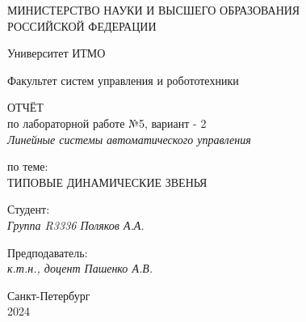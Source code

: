 \thispagestyle{empty}

\begin{center}
    МИНИСТЕРСТВО НАУКИ И ВЫСШЕГО ОБРАЗОВАНИЯ \\ РОССИЙСКОЙ ФЕДЕРАЦИИ

    \vspace{20pt}

    Университет ИТМО

    \vspace{20pt}

    Факультет систем управления и робототехники
\end{center}

\vfill

\begin{center}
    ОТЧЁТ \\  
    по лабораторной работе  №5, вариант - 2 \\
    \textit{Линейные системы автоматического управления}

    \vspace{20pt}

    по теме: \\
    \uppercase{Типовые динамические звенья}
\end{center}

\vfill

\noindent Студент: \\
\textit{Группа R3336 \hfill Поляков А.А.}


    \vspace{20pt}

    \noindent Предподаватель: \\
    \textit{к.т.н., доцент \hfill  Пашенко А.В.}

\vfill

\begin{center}
    Санкт-Петербург \\ 2024
\end{center}